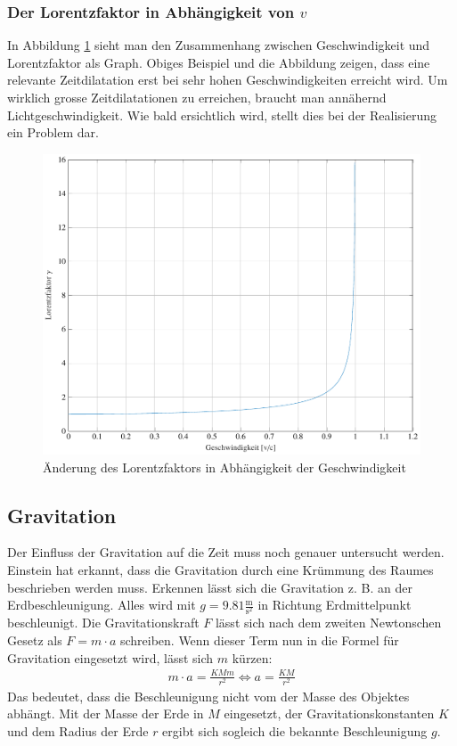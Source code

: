 \begin{refsection}
\subsubsection{Der Lorentzfaktor in Abhängigkeit von $v$}
In Abbildung \ref{skript:zeitreisen:fig:lorentz} sieht man den Zusammenhang zwischen Geschwindigkeit und Lorentzfaktor als Graph. Obiges Beispiel und die Abbildung zeigen, dass eine relevante Zeitdilatation erst bei sehr hohen Geschwindigkeiten erreicht wird. Um wirklich grosse Zeitdilatationen zu erreichen, braucht man annähernd Lichtgeschwindigkeit. Wie bald ersichtlich wird, stellt dies bei der Realisierung ein Problem dar.
\begin{figure}[H]
   \centering
   \includegraphics[width=12cm]{zeitreisen/tikz/lorentz.pdf}
   \caption{Änderung des Lorentzfaktors in Abhängigkeit der Geschwindigkeit}
   \label{skript:zeitreisen:fig:lorentz} 
\end{figure}
\subsection{Gravitation} \label{Gravitation}
	Der Einfluss der Gravitation auf die Zeit muss noch genauer untersucht werden. Einstein hat erkannt, dass die Gravitation durch eine Krümmung des Raumes beschrieben werden muss. Erkennen lässt sich die Gravitation z. B. an der Erdbeschleunigung. Alles wird mit $g=9.81\frac{\text{m}}{\text{s}^2}$ in Richtung Erdmittelpunkt beschleunigt. Die Gravitationskraft $F$ lässt sich nach dem zweiten Newtonschen Gesetz als $F=m\cdot a$ schreiben. Wenn dieser Term nun in die Formel für Gravitation eingesetzt wird, lässt sich $m$ kürzen: 
	\begin{align*}
		m\cdot a = \frac{KMm}{r^2} \Leftrightarrow a=\frac{KM}{r^2} 
	\end{align*}
    Das bedeutet, dass die Beschleunigung nicht vom der Masse des Objektes abhängt. Mit der Masse der Erde in $M$ eingesetzt, der Gravitationskonstanten $K$ und dem Radius der Erde $r$ ergibt sich sogleich die bekannte Beschleunigung $g$.
    

\end{refsection}
